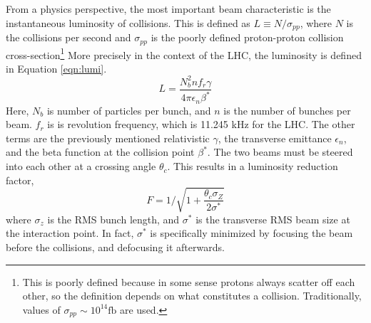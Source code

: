 From a physics perspective, the most important beam characteristic is the instantaneous luminosity of collisions.
This is defined as $L\equiv N/\sigma_{pp}$, where $N$ is the collisions per second and $\sigma_{pp}$ is the poorly defined proton-proton collision cross-section\footnote{This is poorly defined because in some sense protons always scatter off each other, so the definition depends on what constitutes a collision. Traditionally, values of $\sigma_{pp}\sim10^{14}\text{fb}$ are used.} \cite{lyndon}
More precisely in the context of the LHC, the luminosity is defined in Equation \ref{eqn:lumi}.\cite{lyndon}
\begin{equation}\label{eqn:lumi}
    L=\frac{N_b^2nf_r\gamma}{4\pi\epsilon_n\beta^*}
\end{equation}
Here, $N_b$ is number of particles per bunch, and $n$ is the number of bunches per beam.
$f_r$ is is revolution frequency, which is 11.245 kHz for the LHC.
The other terms are the previously mentioned relativistic $\gamma$, the transverse emittance $\epsilon_n$, and the beta function at the collision point $\beta^*$.
The two beams must be steered into each other at a crossing angle $\theta_c$.
This results in a luminosity reduction factor,
\begin{equation}\label{eqn:lumiReduce}
    F=1/\sqrt{1+\frac{\theta_c\sigma_Z}{2\sigma^*}}
\end{equation}
where $\sigma_z$ is the RMS bunch length, and $\sigma^*$ is the transverse RMS beam size at the interaction point.
In fact, $\sigma^*$ is specifically minimized by focusing the beam before the collisions, and defocusing it afterwards.

